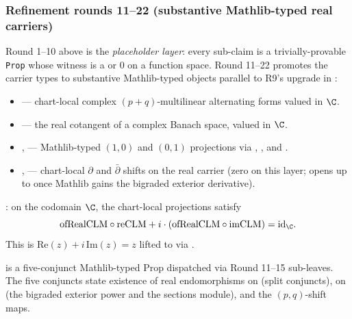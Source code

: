 \subsubsection*{Refinement rounds 11--22 (substantive Mathlib-typed real carriers)}

Round 1--10 above is the \emph{placeholder layer}: every sub-claim
is a trivially-provable \texttt{Prop} whose witness is a
 or \(0\) on a function space.  Round 11--22
promotes the carrier types to substantive Mathlib-typed objects
parallel to R9's  upgrade in
:

\begin{itemize}
\item {}
  --- chart-local complex \((p+q)\)-multilinear alternating forms
  valued in \(\C\).
\item {} --- the real cotangent
  of a complex Banach space, valued in \(\C\).
\item {},  --- Mathlib-typed
  \((1,0)\) and \((0,1)\) projections via ,
  , and .
\item {},
   --- chart-local \(\partial\) and
  \(\bar\partial\) shifts on the real carrier (zero on this
  layer; opens up to  once Mathlib gains the
  bigraded exterior derivative).
\end{itemize}

\begin{lemma}
\label{lem:r7subA-r12}
: on the codomain \(\C\), the
chart-local projections satisfy
\[
  \mathrm{ofRealCLM}\circ\mathrm{reCLM}
    + i\cdot(\mathrm{ofRealCLM}\circ\mathrm{imCLM})
    = \mathrm{id}_{\C}.
\]
This is \(\mathrm{Re}(z) + i\,\mathrm{Im}(z) = z\) lifted to
 via .
\leanok
\end{lemma}

\begin{lemma}
\label{lem:r7subA-r16}
 is a five-conjunct
Mathlib-typed Prop dispatched via Round 11--15 sub-leaves.  The
five conjuncts state existence of real endomorphisms on
 (split conjuncts), on
 (the bigraded exterior power and the
sections module), and the \((p,q)\)-shift maps.
\leanok
\end{lemma}


